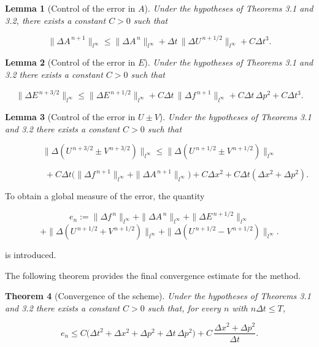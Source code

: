 \documentclass[11pt,a4paper,twoside,pdf]{article}
\numberwithin{equation}{section}
\newtheorem{theorem}{Theorem}[section]
\newtheorem{lemma}[theorem]{Lemma}
\begin{document}
\begin{lemma}[Control of the error in $A$]
Under the hypotheses of Theorems 3.1 and 3.2, there exists a constant $C>0$ such that


\[
\|\Delta A^{\,n+1}\|_{l^\infty}
\le \|\Delta A^{\,n}\|_{l^\infty}
+ \Delta t\,\|\Delta U^{\,n+1/2}\|_{l^\infty}
+ C\Delta t^3.
\]


\end{lemma}



\begin{lemma}[Control of the error in $E$]
Under the hypotheses of Theorems 3.1 and 3.2 there exists a constant $C>0$ such that


\[
\|\Delta E^{\,n+3/2}\|_{l^\infty}
\le \|\Delta E^{\,n+1/2}\|_{l^\infty}
+ C\Delta t\,\|\Delta f^{\,n+1}\|_{l^\infty}
+ C\Delta t\,\Delta p^2
+ C\Delta t^3.
\]


\end{lemma}


\begin{lemma}[Control of the error in $U\pm V$]
Under the hypotheses of Theorems 3.1 and 3.2 there exists a constant
$C>0$ such that


\[
\|\Delta(U^{\,n+3/2} \pm V^{\,n+3/2})\|_{l^\infty}
\le
\|\Delta(U^{\,n+1/2} \pm V^{\,n+1/2})\|_{l^\infty}
\]




\[
\qquad\qquad
+ C\Delta t\big(\|\Delta f^{\,n+1}\|_{l^\infty}
+ \|\Delta A^{\,n+1}\|_{l^\infty}\big)
+ C\Delta x^2
+ C\Delta t(\Delta x^2 + \Delta p^2).
\]


\end{lemma}



To obtain a global measure of the error, the quantity


\[
e_n :=
\|\Delta f^{\,n}\|_{l^\infty}
+ \|\Delta A^{\,n}\|_{l^\infty}
+ \|\Delta E^{\,n+1/2}\|_{l^\infty}
\]
\[
+ \|\Delta(U^{\,n+1/2}+V^{\,n+1/2})\|_{l^\infty}
+ \|\Delta(U^{\,n+1/2}-V^{\,n+1/2})\|_{l^\infty}.
\]


is introduced.

The following theorem provides the final convergence estimate for the method.

\begin{theorem}[Convergence of the scheme]
Under the hypotheses of Theorems 3.1 and 3.2 there exists a constant
$C>0$ such that, for every $n$ with $n\Delta t\le T$,


\[
e_n \le
C\big(\Delta t^2 + \Delta x^2 + \Delta p^2 + \Delta t\,\Delta p^2\big)
+ C\,\frac{\Delta x^2 + \Delta p^2}{\Delta t}.
\]


\end{theorem}
\end{document}
